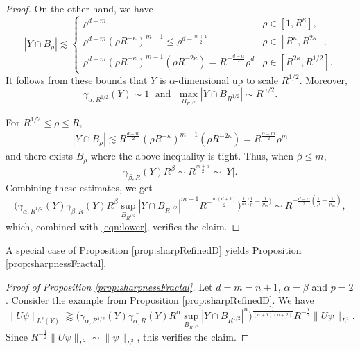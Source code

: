 \documentclass[11pt]{amsart}
\theoremstyle{definition}
\theoremstyle{remark}
\numberwithin{equation}{section}
\newcommand{\les}{\lesssim}
\begin{document}
\begin{proof}
On the other hand, we have
	\[	|Y\cap B_\rho| \les \begin{cases}
		\rho^{d-m}  &  \rho \in [1,R^{\kappa}], \\
		\rho^{d-m} (\rho R^{-\kappa})^{m-1} \leq  \rho^{d-\frac{m+1}{2}} & \rho \in [R^{\kappa},R^{2\kappa}], \\
		\rho^{d-m} (\rho R^{-\kappa})^{m-1} (\rho R^{-2\kappa}) = R^{-\frac{d-\alpha}{2}} \rho^{d} & \rho \in [R^{2\kappa}, R^{1/2}].
	\end{cases}\]
	It follows from these bounds that $Y$ is $\alpha$-dimensional up to scale $R^{1/2}$. Moreover, 
\[ \gamma_{\alpha,R^{1/2}}(Y) \sim 1 \; \text{ and } \; \max_{B_{R^{1/2}}} | Y \cap B_{R^{1/2}} | \sim R^{\alpha/2}. \]

For $R^{1/2}\leq \rho \leq R$,
\begin{align*}
	|Y\cap B_\rho| \les R^{\frac{d-m}{2}} (\rho R^{-\kappa})^{m-1} (\rho R^{-2\kappa}) =R^{\frac{\alpha-m}{2}} \rho^m
\end{align*}
and there exists $B_\rho$ where the above inequality is tight.  Thus, when $\beta \leq m$, 
\[  \overline{\gamma_{\beta,R}} (Y) R^\beta \sim R^{\frac{m+\alpha}{2}} \sim |Y|. \]
Combining these estimates, we get
\[ \Big( \gamma_{\alpha,R^{1/2}}(Y) \overline{\gamma_{\beta,R}}(Y) R^{\beta}
\sup_{B_{R^{1/2}}} |Y\cap B_{R^{1/2}}|^{m-1}	R^{-\frac{m(d+1)}{2}} \Big)^{\frac{1}{m}\big(\frac{1}{p}-\frac{1}{p_m}\big)} \sim R^{-\frac{d-\alpha}{2} ( \frac{1}{p}-\frac{1}{p_m})},  \]
which, combined with \eqref{eqn:lower}, verifies the claim. 	
\end{proof}

A special case of Proposition \ref{prop:sharpRefinedD} yields Proposition \ref{prop:sharpnessFractal}.
\begin{proof}[Proof of Proposition \ref{prop:sharpnessFractal}]
	  Let $d=m=n+1$, $\alpha=\beta$ and $p=2$. Consider the example from Proposition \ref{prop:sharpRefinedD}. We have 
	  \[ \| U\psi \|_{L^2(Y)} \gtrapprox  \Big( \gamma_{\alpha,R^{1/2}}(Y) \overline{\gamma_{\alpha,R}}(Y) R^{\alpha}
	  \sup_{B_{R^{1/2}}} |Y\cap B_{R^{1/2}}|^{n}  \Big)^{\frac{1}{(n+1)(n+2)}} R^{-\frac{1}{2}}  \| U\psi \|_{L^2}.   \]
	  Since $R^{-\frac{1}{2}}  \| U\psi \|_{L^2} \sim \| \psi \|_{L^2}$, this verifies the claim.
\end{proof}
\end{document}

